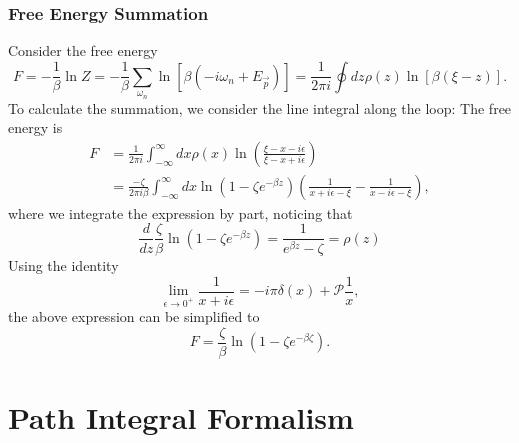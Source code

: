 \documentclass[aps,prb,superscriptaddress,nofootinbib]{revtex4}
\begin{document}
\subsubsection*{Free Energy Summation}
Consider the free energy
\begin{equation}
	F = -\frac{1}{\beta}\ln Z 
	= -\frac{1}{\beta}\sum_{\omega_n}\ln[\beta(-i\omega_n+E_{\vec p})]
	= \frac{1}{2\pi i} \oint dz \rho(z)\ln[\beta(\xi - z)].
\end{equation}
To calculate the summation, we consider the line integral along the loop:
The free energy is
\begin{equation}
\begin{aligned}
	F &= \frac{1}{2\pi i}\int_{-\infty}^\infty dx \rho(x)\ln\left(\frac{\xi-x-i\epsilon}{\xi-x+i\epsilon}\right) \\
	&= \frac{-\zeta}{2\pi i\beta} \int_{-\infty}^{\infty}dx \ln(1-\zeta e^{-\beta z})\left(\frac{1}{x+i\epsilon-\xi}-\frac{1}{x-i\epsilon-\xi}\right),
\end{aligned}
\end{equation}
where we integrate the expression by part, noticing that
\begin{equation}
	\frac{d}{dz} \frac{\zeta}{\beta} \ln(1-\zeta e^{-\beta z}) = \frac{1}{e^{\beta z}-\zeta} = \rho(z)
\end{equation}
Using the identity
\begin{equation*}
	\lim_{\epsilon\rightarrow 0^+} \frac{1}{x+i\epsilon} = -i\pi\delta(x) + \mathcal{P}\frac{1}{x},
\end{equation*}
the above expression can be simplified to
\begin{equation}
	F = \frac{\zeta}{\beta} \ln(1-\zeta e^{-\beta\zeta}).
\end{equation}






\section{Path Integral Formalism}
\end{document}
